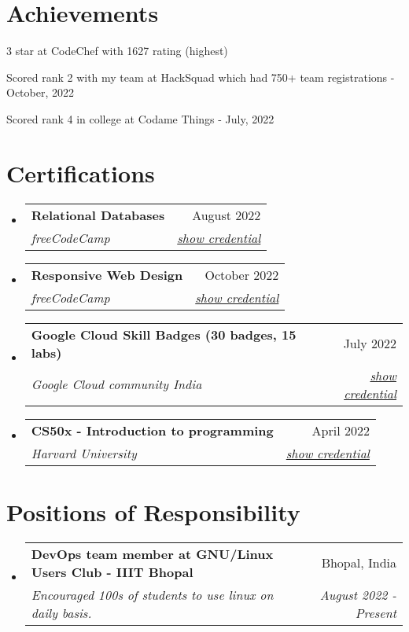 \documentclass[a4paper,20pt]{article}
\makeatletter
\newcommand{\resumeSubheading}[4]{
  \vspace{-1pt}\item
    \begin{tabular*}{0.97\textwidth}{l@{\extracolsep{\fill}}r}
      \textbf{#1} & #2 \\
      \textit{#3} & \textit{#4} \\
    \end{tabular*}\vspace{-5pt}
}
\newcommand{\resumeSubHeadingListStart}{\begin{itemize}[leftmargin=*]}
\newcommand{\resumeSubHeadingListEnd}{\end{itemize}}
\makeatother
\begin{document}
\vspace{-5pt}
\section{Achievements}
\begin{description}[font=$\bullet$]
    \item {3 star at CodeChef with 1627 rating (highest)}
    \vspace{-5pt}
    \item {Scored rank 2 with my team at HackSquad which had 750+ team registrations - October, 2022}
    \vspace{-5pt}
    \item {Scored rank 4 in college at Codame Things - July, 2022}
\end{description}

\vspace{-5pt}
\section{Certifications}
\resumeSubHeadingListStart
    \resumeSubheading
    {Relational Databases}{August 2022}
    {freeCodeCamp}{\href{https://www.freecodecamp.org/certification/satyamrs00/relational-database-v8}{show credential}}

    \resumeSubheading
    {Responsive Web Design}{October 2022}
    {freeCodeCamp}{\href{https://www.freecodecamp.org/certification/satyamrs00/responsive-web-design}{show credential}}
    
    \resumeSubheading
    {Google Cloud Skill Badges (30 badges, 15 labs)}{July 2022}
    {Google Cloud community India} {\href{https://www.cloudskillsboost.google/public_profiles/979efb3e-91bc-476f-ba38-d35c4879a1fa}{show credential}}

    \resumeSubheading
    {CS50x - Introduction to programming}{April 2022}
    {Harvard University}{\href{https://certificates.cs50.io/5a9d3a4b-57f0-4d46-95fa-222159e1368f.pdf?size=letter}{show credential}}
    
\resumeSubHeadingListEnd

\vspace{-5pt}
\section{Positions of Responsibility}
\resumeSubHeadingListStart
    \resumeSubheading
    {DevOps team member at GNU/Linux Users Club - IIIT Bhopal}{Bhopal, India}
    {Encouraged 100s of students to use linux on daily basis.}{August 2022 - Present}
\resumeSubHeadingListEnd
\end{document}
